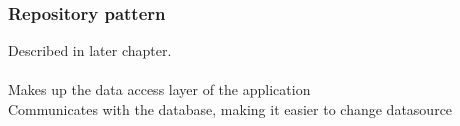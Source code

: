 \subsubsection{Repository pattern}
Described in later chapter. \\ \\
Makes up the data access layer of the application\\
Communicates with the database, making it easier to change datasource\\